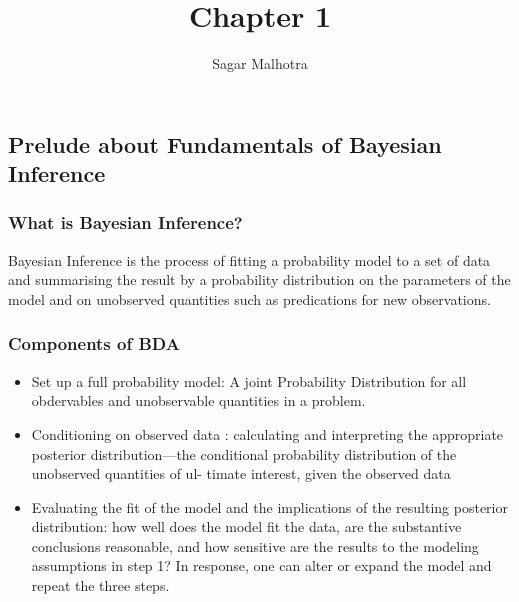\documentclass{article}
\title{Chapter 1}
\author{Sagar Malhotra}
\begin{document}
\maketitle
\newpage
\subsection*{Prelude about Fundamentals of Bayesian Inference}
\subsubsection*{What is Bayesian Inference?}
Bayesian Inference is the process of fitting a probability model to a set of data and summarising the result by a probability distribution on the parameters of the model and on unobserved quantities such as predications for new observations.

\subsubsection*{Components of BDA}
\begin{itemize}
    \item Set up a full probability model: A joint Probability Distribution for all obdervables and unobservable quantities in a problem. 
    \item Conditioning on observed data : calculating and interpreting the appropriate posterior distribution—the conditional probability distribution of the unobserved quantities of ul- timate interest, given the observed data
\noindent{}
    \item Evaluating the fit of the model and the implications of the resulting posterior distribution: how well does the model fit the data, are the substantive conclusions reasonable, and how sensitive are the results to the modeling assumptions in step 1? In response, one can alter or expand the model and repeat the three steps.



\end{itemize}
\end{document}
